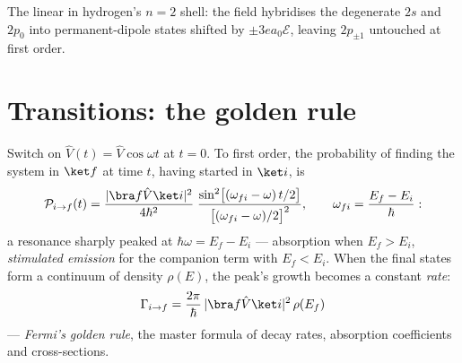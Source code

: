 \begin{omfigure}

{\small The linear  in hydrogen's $n = 2$ shell: the
field hybridises the degenerate $2s$ and $2p_0$ into
permanent-dipole states shifted by $\pm3ea_0\mathcal E$, leaving
$2p_{\pm1}$ untouched at first order.}
\end{omfigure}

\section{Transitions: the golden rule}

\begin{theorem}\label{thm:b3:perturbation-theory:golden}
Switch on $\hat V(t) = \hat V\cos\omega t$ at $t = 0$. To first
order, the probability of finding the system in $\ket f$ at time
$t$, having started in $\ket i$, is
\[
\mathcal P_{i\to f}(t) = \frac{|\bra f\hat V\ket i|^2}{4\hbar^2}\;
\frac{\sin^2\!\big[(\omega_{fi} - \omega)\,t/2\big]}
{\big[(\omega_{fi} - \omega)/2\big]^2} ,
\qquad \omega_{fi} = \frac{E_f - E_i}{\hbar} :
\]
a resonance sharply peaked at $\hbar\omega = E_f - E_i$ ---
absorption when $E_f > E_i$, \emph{stimulated emission} for the
companion term with $E_f < E_i$. When the final states form a
continuum of density $\rho(E)$, the peak's growth becomes a constant
\emph{rate}:
\[
\Gamma_{i\to f} = \frac{2\pi}{\hbar}\,
|\bra f\hat V\ket i|^2\,\rho(E_f)
\]
--- \emph{Fermi's golden rule}, the master formula of decay rates,
absorption coefficients and cross-sections.
\end{theorem}

